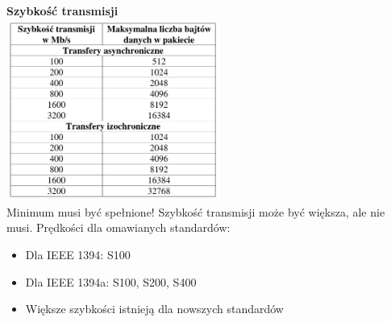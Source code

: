 	\textbf{Szybkość transmisji}\\
	\includegraphics[width=7cm]{./wyklady/FIREWIRE_16_1.pdf}\\
	Minimum musi być spełnione! Szybkość transmisji może być większa, ale nie musi.
	Prędkości dla omawianych standardów:
	\begin{itemize}
		\item Dla IEEE 1394: S100
		\item Dla IEEE 1394a: S100, S200, S400
		\item Większe szybkości istnieją dla nowszych standardów
	\end{itemize}
	
